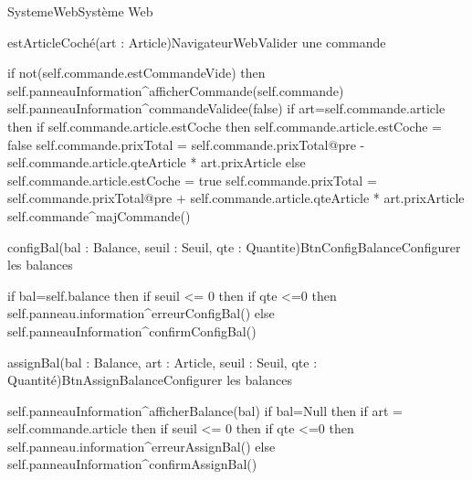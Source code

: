 \begin{OM}{SystemeWeb}{Système Web}
    \begin{OMOperation}{estArticleCoché(art : Article)}{NavigateurWeb}{Valider une commande}
        \begin{OMMessages}
        \end{OMMessages}
        \OMNoPre
        \begin{OMPost}
            if not(self.commande.estCommandeVide) then
            self.panneauInformation^afficherCommande(self.commande)
            self.panneauInformation^commandeValidee(false)
            if art=self.commande.article then
            if self.commande.article.estCoche then
            self.commande.article.estCoche = false
            self.commande.prixTotal = self.commande.prixTotal@pre -
            self.commande.article.qteArticle * art.prixArticle
            else
            self.commande.article.estCoche = true
            self.commande.prixTotal = self.commande.prixTotal@pre +
            self.commande.article.qteArticle * art.prixArticle
            self.commande^majCommande()
        \end{OMPost}
    \end{OMOperation}

    \begin{OMOperation}{configBal(bal : Balance, seuil : Seuil, qte : Quantite)}{BtnConfigBalance}{Configurer les balances}
        \begin{OMMessages}
        \end{OMMessages}
        \OMNoPre
        \begin{OMPost}
            if bal=self.balance then
            if seuil <= 0 then
            if qte <=0 then
            self.panneau.information^erreurConfigBal()
            else
            self.panneauInformation^confirmConfigBal()
        \end{OMPost}
    \end{OMOperation}

    \begin{OMOperation}{assignBal(bal : Balance, art : Article, seuil : Seuil, qte : Quantité)}{BtnAssignBalance}{Configurer les balances}
        \begin{OMMessages}
        \end{OMMessages}
        \OMNoPre
        \begin{OMPost}
            self.panneauInformation^afficherBalance(bal)
            if bal=Null then
            if art = self.commande.article then
            if seuil <= 0 then
            if qte <=0 then
            self.panneau.information^erreurAssignBal()
            else
            self.panneauInformation^confirmAssignBal()
        \end{OMPost}
    \end{OMOperation}
\end{OM}
